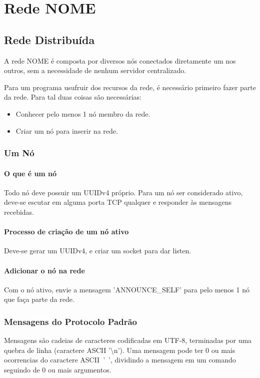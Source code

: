 \chapter{Rede NOME}
\label{sec:rede}

\section{Rede Distribuída}
\label{sec:rede:rede}

  A rede NOME é composta por diversos nós conectados diretamente um nos outros, sem a necessidade
  de nenhum servidor centralizado.
  
  Para um programa usufruir dos recursos da rede, é necessário primeiro fazer parte da rede. Para 
  tal duas coisas são necessárias:
  
  \begin{itemize}
    \item Conhecer pelo menos 1 nó membro da rede.
    \item Criar um nó para inserir na rede.
  \end{itemize}
  
  \subsection{Um Nó}
    \subsubsection{O que é um nó}
      Todo nó deve possuir um UUIDv4 próprio.
      Para um nó ser considerado ativo, deve-se escutar em alguma porta TCP qualquer e responder às
      mensagens recebidas.
      
    \subsubsection{Processo de criação de um nó ativo}
      Deve-se gerar um UUIDv4, e criar um socket para dar listen.

    \subsubsection{Adicionar o nó na rede}
      Com o nó ativo, envie a mensagem 'ANNOUNCE\_SELF' para pelo menos 1 nó que faça parte da rede.

  \subsection{Mensagens do Protocolo Padrão}
    Mensagens são cadeias de caracteres codificadas em UTF-8, terminadas por uma quebra de linha
    (caractere ASCII '\textbackslash n'). Uma mensagem pode ter 0 ou mais ocorrencias do caractere
    ASCII~'~', dividindo a mensagem em um comando seguindo de 0 ou mais argumentos.
    
